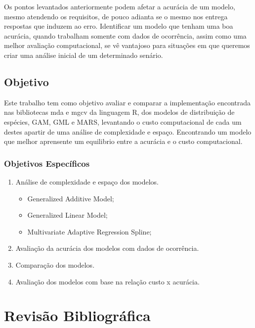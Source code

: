 \documentclass[
	12pt,				%
	openright,			%
	oneside,			%
	a4paper,			%
	english,			%
	brazil				%
	]{abntex2}
\begin{document}
Os pontos levantados anteriormente podem afetar a acurácia de um modelo, mesmo atendendo os requisitos, 
de pouco adianta se o mesmo nos entrega respostas que induzem ao erro. Identificar um modelo que tenham uma boa acurácia, 
quando trabalham somente com dados de ocorrência, assim como uma melhor avaliação computacional, se vê vantajoso para 
situações em que queremos criar uma análise inicial de um determinado senário.

\section{Objetivo}

Este trabalho tem como objetivo avaliar e comparar a implementação encontrada nas bibliotecas mda e mgcv da linguagem R, dos modelos
de distribuição de espécies, GAM, GML e MARS, levantando o custo computacional de cada um destes apartir de uma análise de 
complexidade e espaço. Encontrando um modelo que melhor aprensente um equilibrio entre a acurácia e o custo computacional.

\subsection{Objetivos Específicos}

\begin{enumerate}
	\item Análise de complexidade e espaço dos modelos.
	\begin{itemize}
		\item Generalized Additive Model;
		\item Generalized Linear Model;
		\item Multivariate Adaptive Regression Spline;
	\end{itemize}
	\item Avaliação da acurácia dos modelos com dados de ocorrência.
	\item Comparação dos modelos.
	\item Avaliação dos modelos com base na relação custo x acurácia.
\end{enumerate}



\chapter{Revisão Bibliográfica}
\end{document}
